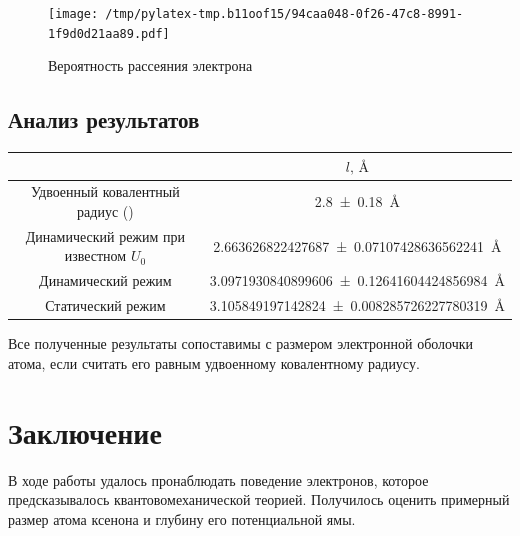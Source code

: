 \documentclass[12pt]{article}%
\begin{document}
\begin{figure}[htbp]%
\centering%
\texttt{[image: /tmp/pylatex-tmp.b11oof15/94caa048-0f26-47c8-8991-1f9d0d21aa89.pdf]}%
\caption{Вероятность рассеяния электрона}%
\end{figure}

%
\subsection{Анализ результатов}%
\label{subsec:}%
\begin{center}%
\begin{tabular}{@{}c|c@{}}%
\toprule%
&$l \text{, } \unit{\angstrom}$\\%
\midrule%
Удвоенный ковалентный радиус (\cite{enwiki:1114639486})&\SI[uncertainty-mode=separate,round-mode=uncertainty,round-precision=1,separate-uncertainty-units=single]{2.8 +- 0.18}{\angstrom}\\%
Динамический режим при известном $U_0$&\SI[uncertainty-mode=separate,round-mode=uncertainty,round-precision=1,separate-uncertainty-units=single]{2.663626822427687 +- 0.07107428636562241}{\angstrom}\\%
Динамический режим&\SI[uncertainty-mode=separate,round-mode=uncertainty,round-precision=1,separate-uncertainty-units=single]{3.0971930840899606 +- 0.12641604424856984}{\angstrom}\\%
Статический режим&\SI[uncertainty-mode=separate,round-mode=uncertainty,round-precision=1,separate-uncertainty-units=single]{3.105849197142824 +- 0.008285726227780319}{\angstrom}\\\bottomrule%
%
\end{tabular}%
\end{center}%

            Все полученные результаты сопоставимы с размером электронной
            оболочки атома, если считать его равным удвоенному ковалентному радиусу.
        

%
\section{Заключение}%
\label{sec:}%

        В ходе работы удалось пронаблюдать поведение электронов, которое предсказывалось квантовомеханической теорией.
        Получилось оценить примерный размер атома ксенона и глубину его потенциальной ямы.
    

%
\printbibliography%
\end{document}
